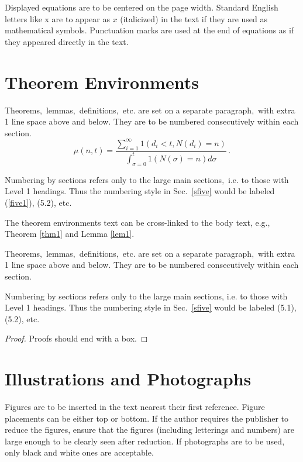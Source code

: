 \documentclass{ws-ijtaf}
\begin{document}
Displayed equations are to be centered on the page width.  Standard
English letters like x are to appear as $x$ (italicized) in the text
if they are used as mathematical symbols. Punctuation marks are used
at the end of equations as if they appeared directly in the text.

\section{Theorem Environments\label{sfive}}

\begin{theorem}
\label{thm1}
Theorems$,$ lemmas$,$ definitions$,$ etc. are set on a separate
paragraph$,$ with extra 1 line space above and below. They are
to be numbered consecutively within each section.
\begin{equation}
\mu(n, t) = \frac{\sum^\infty_{i=1} 1(d_i < t, N(d_i)
= n)}{\int^t_{\sigma=0} 1(N(\sigma) = n)d\sigma}\,.
\label{five1}
\end{equation}

Numbering by sections refers only to the large main sections$,$
i.e. to those with Level 1 headings.  Thus the numbering style in
Sec.~{\upshape\ref{sfive}}
would be labeled {\upshape (\ref{five1}),} {\upshape (5.2),} etc.
\end{theorem}

The theorem environments text can be cross-linked to the body text,
e.g.,\break
Theorem \ref{thm1} and Lemma \ref{lem1}.

\begin{lemma}[Sample]
\label{lem1}
Theorems$,$ lemmas$,$ definitions$,$ etc. are set on a separate paragraph$,$
with extra 1 line space above and below. They are to be numbered
consecutively within each section.

Numbering by sections refers only to the large main sections, i.e. to
those with Level 1 headings.  Thus the numbering style in
Sec.~{\upshape\ref{sfive}} would be labeled {\upshape (5.1),}
{\upshape (5.2),} etc.
\end{lemma}

\begin{proof}
Proofs should end with a box.
\end{proof}

\vspace{-12pt}
\section{Illustrations and Photographs}
Figures are to be inserted in the text nearest their first reference.
Figure placements can be either top or bottom. If the author requires the publisher to reduce the figures, ensure that the figures (including letterings and numbers) are large enough to be clearly seen after reduction. If
photographs are to be used, only black and white ones are acceptable.
\end{document}
